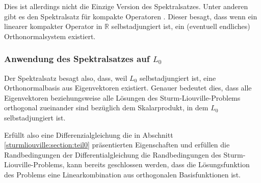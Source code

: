 Dies ist allerdings nicht die Einzige Version des Spektralsatzes.
Unter anderen gibt es den Spektralsatz für kompakte Operatoren 
\cite{sturmliouville:spektralsatz-wiki}.
Dieser besagt, dass wenn ein linearer kompakter Operator in
$\mathbb{R}$ selbstadjungiert ist, ein (eventuell endliches)
Orthonormalsystem existiert.

\subsubsection{Anwendung des Spektralsatzes auf $L_0$}

Der Spektralsatz besagt also, dass, weil $ L_0 $ selbstadjungiert ist, eine
Orthonormalbasis aus Eigenvektoren existiert.
Genauer bedeutet dies, dass alle Eigenvektoren beziehungsweise alle Lösungen
des Sturm-Liouville-Problems orthogonal zueinander sind bezüglich dem
Skalarprodukt, in dem $ L_0 $ selbstadjungiert ist.

Erfüllt also eine Differenzialgleichung die in Abschnitt
\ref{sturmliouville:section:teil0} präsentierten Eigenschaften und erfüllen
die Randbedingungen der Differentialgleichung die Randbedingungen
des Sturm-Liouville-Problems, kann bereits geschlossen werden, dass die
Lösungsfunktion des Problems eine Linearkombination aus orthogonalen
Basisfunktionen ist.